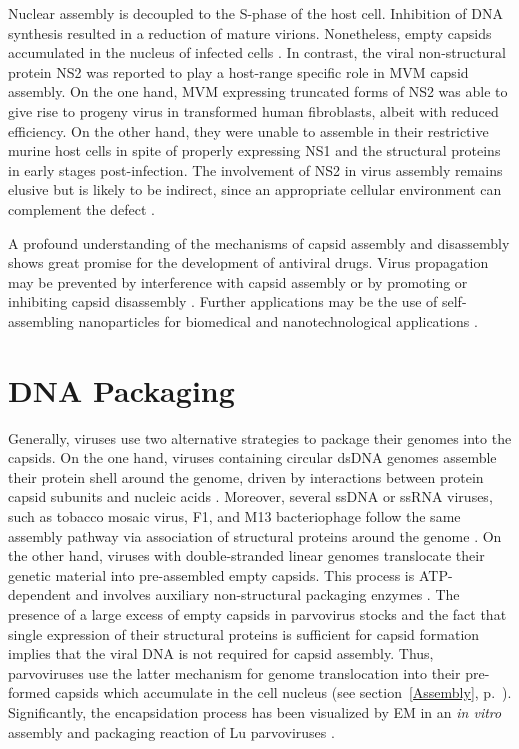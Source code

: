 Nuclear assembly is decoupled to the S-phase of the host cell. Inhibition of DNA synthesis resulted in a reduction of mature virions. Nonetheless, empty capsids accumulated in the nucleus of infected cells \cite{pmid559779, assembly}. In contrast, the viral non-structural protein NS2 was reported to play a host-range specific role in MVM capsid assembly. On the one hand, MVM expressing truncated forms of NS2 was able to give rise to progeny virus in transformed human fibroblasts, albeit with reduced efficiency. On the other hand, they were unable to assemble in their restrictive murine host cells in spite of properly expressing NS1 and the structural proteins in early stages post-infection. The involvement of NS2 in virus assembly remains elusive but is likely to be indirect, since an appropriate cellular environment can complement the defect \cite{pmid9168889}.        


A profound understanding of the mechanisms of capsid assembly and disassembly shows great promise for the development of antiviral drugs. Virus propagation may be prevented by interference with capsid assembly or by promoting or inhibiting capsid disassembly \cite{pmid21762804, pmid21163649}. Further applications may be the use of self-assembling nanoparticles for biomedical and nanotechnological applications \cite{pmid16521330, pmid16690856}.     


  
\section{DNA Packaging}
\label{Packaging}

Generally, viruses use two alternative strategies to package their genomes into the capsids. On the one hand, viruses containing circular dsDNA genomes assemble their protein shell around the genome, driven by interactions between protein capsid subunits and nucleic acids \cite{pmid6101085, pmid6305987, pmid1323699}. Moreover, several ssDNA or ssRNA viruses, such as tobacco mosaic virus, F1, and M13 bacteriophage follow the same assembly pathway via association of structural proteins around the genome \cite{pmid11406604}. On the other hand, viruses with double-stranded linear genomes translocate their genetic material into pre-assembled empty capsids. This process is ATP-dependent and involves auxiliary non-structural packaging enzymes \cite{pmid2679356}. The presence of a large excess of empty capsids in parvovirus stocks and the fact that single expression of their structural proteins is sufficient for capsid formation \cite{pmid1331503} implies that the viral DNA is not required for capsid assembly. Thus, parvoviruses use the latter mechanism for genome translocation into their pre-formed capsids which accumulate in the cell nucleus (see section~\ref{Assembly}, p.~\pageref{Assembly}). Significantly, the encapsidation process has been visualized by EM in an \textit{in vitro} assembly and packaging reaction of Lu parvoviruses \cite{pmid6221078}.

